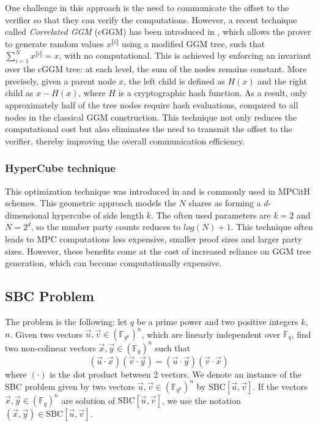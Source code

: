 \documentclass[english]{article}
\newcommand{\lir}{\llbracket i \rrbracket}
\begin{document}
		One challenge in this approach is the need to communicate the offset to the verifier so that they can verify the computations. However, a recent technique called \emph{Correlated GGM} (cGGM) has been introduced in \cite{GYWZ+22}, which allows the prover to generate random values $x^{\lir}$ using a modified GGM tree, such that $\sum_{i=1}^{N} x^{\lir} = x$, with no computational.
		This is achieved by enforcing an invariant over the cGGM tree: at each level, the sum of the nodes remains constant. More precisely, given a parent node $x$, the left child is defined as $H(x)$ and the right child as $x - H(x)$, where $H$ is a cryptographic hash function. As a result, only approximately half of the tree nodes require hash evaluations, compared to all nodes in the classical GGM construction.
		This technique not only reduces the computational cost but also eliminates the need to transmit the offset to the verifier, thereby improving the overall communication efficiency. 
		
		\subsubsection{HyperCube technique}
 		This optimization technique was introduced in \cite{AGHH+22} and is commonly used in MPCitH schemes. This geometric approach models the $N$ shares as forming a $d$-dimensional hypercube of side length $k$. The often used parameters are $k = 2$ and $N = 2^d$, so the number party counts reduces to $log(N) + 1$. This technique often leads to MPC computations less expensive, smaller proof sizes and larger party sizes. However, these benefits come at the cost of increased reliance on GGM tree generation, which can become computationally expensive.
		
		\subsection{SBC Problem}
		The problem is the following: let $q$ be a prime power and two positive integers $k$, $n$.
		\newline
		Given two vectors $\vec{u}, \vec{v} \in (\mathbb{F}_{q^k})^n$, which are linearly independent over $\mathbb{F}_q$, find two non-colinear vectors $\vec{x}, \vec{y} \in (\mathbb{F}_q)^n$ such that $$(\vec{u} \cdot \vec{x})(\vec{v} \cdot \vec{y}) = (\vec{u} \cdot \vec{y})(\vec{v} \cdot \vec{x})$$
		where $(\cdot)$ is the dot product between 2 vectors.
		We denote an instance of the SBC problem given by two vectors $\vec{u}, \vec{v} \in (\mathbb{F}_{q^k})^n$ by $\text{SBC}[\vec{u}, \vec{v}]$. If the vectors $\vec{x},\vec{y} \in (\mathbb{F}_q)^n$ are solution of $\text{SBC}[\vec{u},\vec{v}]$, we use the notation $(\vec{x}, \vec{y}) \in \text{SBC}[\vec{u}, \vec{v}]$.
		
\end{document}
